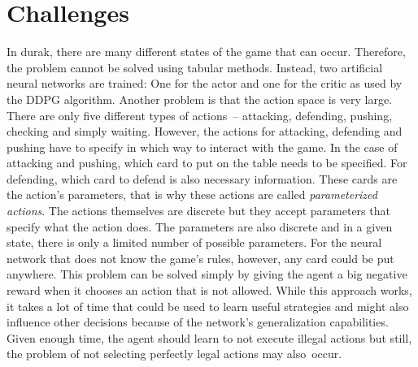 \documentclass[a4paper,titlepage]{article}
\begin{document}
\newpage

\section{Challenges}

\label{sec:challenges}
In durak, there are many different states of the game that can occur. Therefore, the problem cannot be solved using tabular methods. Instead, two artificial neural networks are trained: One for the actor and one for the critic as used by the DDPG algorithm.
Another problem is that the action space is very large. There are only five different types of actions~-- attacking, defending, pushing, checking and simply waiting. However, the actions for attacking, defending and pushing have to specify in which way to interact with the game. In the case of attacking and pushing, which card to put on the table needs to be specified. For defending, which card to defend is also necessary information. These cards are the action's parameters, that is why these actions are called \emph{parameterized actions}. The actions themselves are discrete but they accept parameters that specify what the action does. The parameters are also discrete and in a given state, there is only a limited number of possible parameters. For the neural network that does not know the game's rules, however, any card could be put anywhere. This problem can be solved simply by giving the agent a big negative reward when it chooses an action that is not allowed. While this approach works, it takes a lot of time that could be used to learn useful strategies and might also influence other decisions because of the network's generalization capabilities. Given enough time, the agent should learn to not execute illegal actions but still, the problem of not selecting perfectly legal actions may also~occur.
\end{document}
